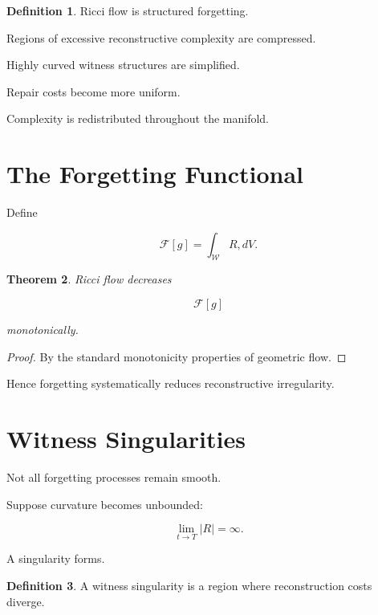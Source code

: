 \documentclass[12pt,oneside]{book}
\theoremstyle{plain} \newtheorem{theorem}{Theorem}[chapter] \newtheorem{lemma}[theorem]{Lemma} \newtheorem{proposition}[theorem]{Proposition} \newtheorem{corollary}[theorem]{Corollary}
\theoremstyle{definition} \newtheorem{definition}[theorem]{Definition} \newtheorem{axiom}[theorem]{Axiom} \newtheorem{construction}[theorem]{Construction}
\theoremstyle{remark} \newtheorem{remark}[theorem]{Remark} \newtheorem{example}[theorem]{Example}
\begin{document}
\begin{definition}

Ricci flow is structured forgetting.

\end{definition}

Regions of excessive reconstructive complexity are compressed.

Highly curved witness structures are simplified.

Repair costs become more uniform.

Complexity is redistributed throughout the manifold.

\section{The Forgetting Functional}

Define

\[
\mathcal F[g]
=
\int_{\mathcal W}
R
,dV.
\]

\begin{theorem}

Ricci flow decreases

\[
\mathcal F[g]
\]

monotonically.

\end{theorem}

\begin{proof}

By the standard monotonicity properties of geometric flow.

\end{proof}

Hence forgetting systematically reduces reconstructive irregularity.

\section{Witness Singularities}

Not all forgetting processes remain smooth.

Suppose curvature becomes unbounded:

\[
\lim_{t\rightarrow T}
|R|
=
\infty.
\]

A singularity forms.

\begin{definition}

A witness singularity is a region where reconstruction costs diverge.

\end{definition}
\end{document}
